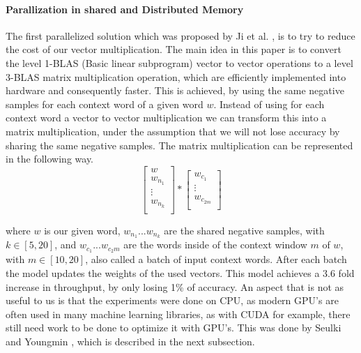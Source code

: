 \documentclass[conference]{IEEEtran}
\begin{document}
\paragraph{Parallization in shared and Distributed Memory}
The first parallelized solution which was proposed by Ji et al. \cite{intel}, is to try to reduce the cost of our vector multiplication. The main idea in this paper is to convert the level 1-BLAS (Basic linear subprogram) vector to vector operations to a level 3-BLAS matrix multiplication operation, which are efficiently implemented into hardware and consequently faster. This is achieved, by using the same negative samples for each context word of a given word $w$. Instead of using for each context word a vector to vector multiplication we can transform this into a matrix multiplication, under the assumption that we will not lose accuracy by sharing the same negative samples. The matrix multiplication can be represented in the following way.
\[
\begin{bmatrix}
w \\
w_{n_1} \\
\vdots \\
w_{n_k}\\
\end{bmatrix}
*
\begin{bmatrix}
w_{c_1}\\
\vdots\\
w_{c_{2m}}\\
\end{bmatrix}
\]

where $w$ is our given word, $w_{n_1}...w_{n_k}$ are the shared negative samples, with $k \in [5,20]$, and $w_{c_1}...w_{c_2m}$ are the words inside of the context window $m$ of $w$, with $m \in [10,20]$, also called a batch of input context words. After each batch the model updates the weights of the used vectors.
This model achieves a 3.6 fold increase in throughput, by only losing 1\% of accuracy. An aspect that is not as useful to us is that the experiments were done on CPU, as modern GPU's are often used in many machine learning libraries, as with CUDA for example, there still need work to be done to optimize it with GPU's. This was done by Seulki and Youngmin \cite{gpu}, which is described in the next subsection.
\end{document}
